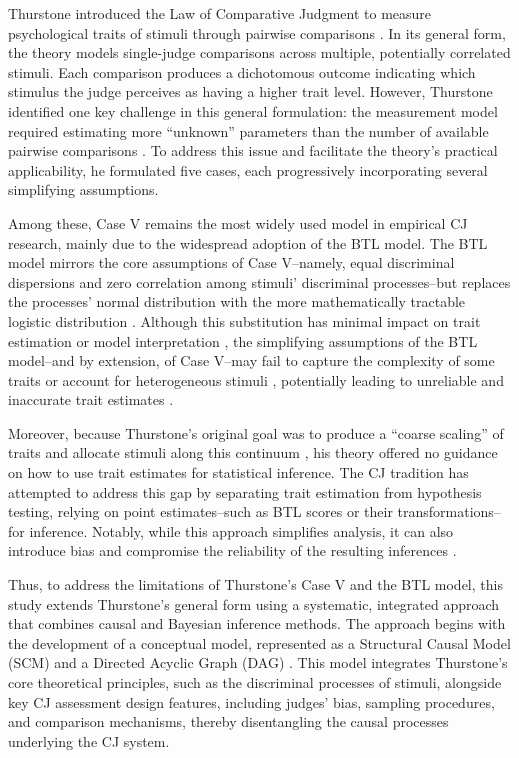\documentclass[
  authoryear,
  review,
  1p]{elsarticle}
\begin{document}
Thurstone introduced the Law of Comparative Judgment to measure
psychological traits of stimuli through pairwise comparisons
\citep{Thurstone_1927a, Thurstone_1927b}. In its general form, the
theory models single-judge comparisons across multiple, potentially
correlated stimuli. Each comparison produces a dichotomous outcome
indicating which stimulus the judge perceives as having a higher trait
level. However, Thurstone identified one key challenge in this general
formulation: the measurement model required estimating more ``unknown''
parameters than the number of available pairwise comparisons
\citep{Thurstone_1927b}. To address this issue and facilitate the
theory's practical applicability, he formulated five cases, each
progressively incorporating several simplifying assumptions.

Among these, Case V remains the most widely used model in empirical CJ
research, mainly due to the widespread adoption of the BTL model. The
BTL model mirrors the core assumptions of Case V--namely, equal
discriminal dispersions and zero correlation among stimuli' discriminal
processes--but replaces the processes' normal distribution with the more
mathematically tractable logistic distribution
\citep{Andrich_1978, Bramley_2008}. Although this substitution has
minimal impact on trait estimation or model interpretation
\citep{vanderLinden_et_al_2017_I, McElreath_2021}, the simplifying
assumptions of the BTL model--and by extension, of Case V--may fail to
capture the complexity of some traits or account for heterogeneous
stimuli
\citep{Thurstone_1927a, Andrich_1978, Bramley_2008, Kelly_et_al_2022},
potentially leading to unreliable and inaccurate trait estimates
\citep{Ackerman_1989, Zimmerman_1994, McElreath_2020, Hoyle_et_al_2023}.

Moreover, because Thurstone's original goal was to produce a ``coarse
scaling'' of traits and allocate stimuli along this continuum
\citep[pp.~269]{Thurstone_1927a}, his theory offered no guidance on how
to use trait estimates for statistical inference. The CJ tradition has
attempted to address this gap by separating trait estimation from
hypothesis testing, relying on point estimates--such as BTL scores or
their transformations--for inference. Notably, while this approach
simplifies analysis, it can also introduce bias and compromise the
reliability of the resulting inferences
\citep{McElreath_2020, Kline_et_al_2023, Hoyle_et_al_2023}.

Thus, to address the limitations of Thurstone's Case V and the BTL
model, this study extends Thurstone's general form using a systematic,
integrated approach that combines causal and Bayesian inference methods.
The approach begins with the development of a conceptual model,
represented as a Structural Causal Model (SCM) and a Directed Acyclic
Graph (DAG)
\citep{Pearl_2009, Pearl_et_al_2016, Gross_et_al_2018, Neal_2020}. This
model integrates Thurstone's core theoretical principles, such as the
discriminal processes of stimuli, alongside key CJ assessment design
features, including judges' bias, sampling procedures, and comparison
mechanisms, thereby disentangling the causal processes underlying the CJ
system.
\end{document}
